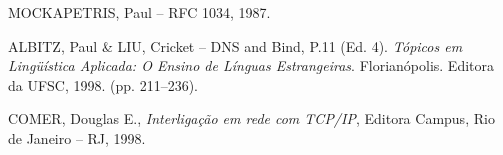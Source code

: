 \begin{thebibliography}{9}
MOCKAPETRIS, Paul -- RFC 1034, 1987.

ALBITZ, Paul \& LIU, Cricket -- DNS
  and Bind, P.11 (Ed. 4).
\emph{Tópicos em Lingüística Aplicada: O Ensino de Línguas
Estrangeiras}. Florianópolis. Editora da UFSC, 1998. (pp. 211--236).

 COMER, Douglas E., \emph{Interligação em
  rede com TCP/IP}, Editora Campus, Rio de Janeiro -- RJ, 1998.



\end{thebibliography}

